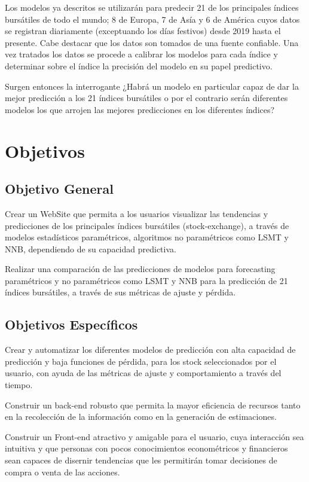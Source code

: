 \documentclass[twoside]{article}
\theoremstyle{definition}
\theoremstyle{example}
\theoremstyle{remark}
\numberwithin{equation}{section}%
\begin{document}
Los modelos ya descritos se utilizarán para predecir 21 de los principales índices bursátiles de todo el mundo; 8 de Europa, 7 de Asía y 6 de América cuyos datos se registran diariamente (exceptuando los días festivos) desde 2019 hasta el presente. Cabe destacar que los datos son tomados de una fuente confiable\cite{5}. Una vez tratados los datos se procede a calibrar los modelos para cada índice y determinar sobre el índice la precisión del modelo en su papel predictivo. 

Surgen entonces la interrogante ¿Habrá un modelo en particular capaz de dar la mejor predicción a los 21 índices bursátiles o por el contrario serán diferentes modelos los que arrojen las mejores predicciones en los diferentes índices?

 
\section{Objetivos}
\subsection{Objetivo General}
Crear un WebSite que permita a los usuarios visualizar las tendencias y predicciones de los principales índices bursátiles (stock-exchange), a través de modelos estadísticos paramétricos, algoritmos no paramétricos como LSMT y NNB\cite{1,2}, dependiendo de su capacidad predictiva.

Realizar una comparación de las predicciones de modelos para forecasting paramétricos y no paramétricos como LSMT y NNB para la predicción de 21 índices bursátiles, a través de sus métricas de ajuste y pérdida.
 
\subsection{Objetivos Específicos}
Crear y automatizar los diferentes modelos de predicción con alta capacidad de predicción y baja funciones de pérdida, para los stock seleccionados por el usuario, con ayuda de las métricas de ajuste y comportamiento a través del tiempo.

Construir un back-end robusto que permita la mayor eficiencia de recursos tanto en la recolección de la información como en la generación de estimaciones.

Construir un Front-end atractivo y amigable para el usuario, cuya interacción sea intuitiva y que personas con pocos conocimientos econométricos y financieros sean capaces de disernir tendencias que les permitirán tomar decisiones de compra o venta de las acciones.
\end{document}
